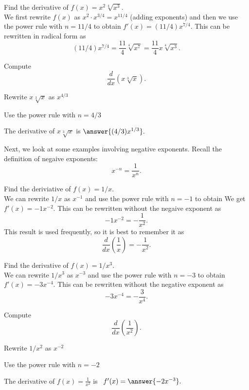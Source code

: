 \documentclass{ximera}
\begin{document}
\begin{example} %
Find the derivative of $f(x) = x^2\sqrt[4] {x^3}$.\\
We first rewrite $f(x)$ 
as $x^2 \cdot x^{3/4} = x^{11/4}$ (adding exponents) and then we use the power rule with $n = 11/4$
to obtain $f'(x) = (11/4)x^{7/4}$. This can be rewritten in radical form as 
\[(11/4)x^{7/4}  = \frac{11}{4} \sqrt[4] {x^7} = \frac{11}{4} x\sqrt[4] {x^3} .\]
\end{example}

\begin{problem}
Compute
\[
\frac{d}{dx} \left(x\sqrt[3] x\right).
\]
\begin{hint}
Rewrite $x\sqrt[3] x$ as $x^{4/3}$
\end{hint}
\begin{hint}
Use the power rule with $n = 4/3$
\end{hint}
The derivative of $x\sqrt[3] x$ is $\answer{(4/3) x^{1/3}}.$
\end{problem}

Next, we look at some examples involving negative exponents. Recall the definition of negaive exponents:
\[x^{-n} = \frac{1}{x^n}.\]

\begin{example} %
Find the deriviative of $f(x) = 1/x$.\\
We can rewrite $1/x$ as $x^{-1}$ and use the power rule with $n = -1$ to obtain 
We get $f'(x) = -1x^{-2}$.
This can be rewritten without the negaive exponent as
\[ -1x^{-2} = -\frac{1}{x^2}.\]
This result is used frequently, so it is best to remember it as
\[\frac{d}{dx}\left(\frac{1}{x}\right) = -\frac{1}{x^2}.\]
\end{example}


\begin{example} %
Find the derivative of $f(x) = 1/x^3$.\\
We can rewrite $1/x^3$ as $x^{-3}$ and use the power rule with $n = -3$ to obtain 
$f'(x) = -3x^{-4}$.
This can be rewritten without the negative exponent as
\[-3x^{-4} = -\frac{3}{x^4}.\]
\end{example}

\begin{problem}
Compute
\[
\frac{d}{dx} \left(\frac{1}{x^2}\right).
\]
\begin{hint}
Rewrite $1/x^2$ as $x^{-2}$
\end{hint}
\begin{hint}
Use the power rule with $n = -2$
\end{hint}
The derivative of $f(x) = \frac{1}{x^2}$ is \ $f'(x) = \answer{-2x^{-3}}.$
\end{problem}
\end{document}
